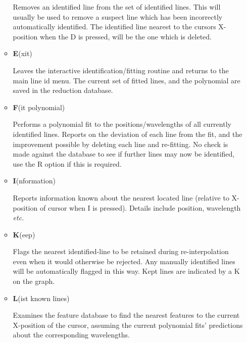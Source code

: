 \documentclass[twoside,11pt,nolof]{starlink}
\newcommand{\sunspec}[2]{#2}
\newcommand{\myindex}[1]{\index{#1}}
\begin{document}
\begin{itemize}
\begin{itemize}
            Removes an identified line from
            the set of identified lines. This will usually be used to
            remove a suspect line which has been incorrectly automatically
            identified. The identified line nearest to the cursors
            X-position when the D is pressed,  will be the one which is
            deleted.

      \item {\sunspec{\Large\tt}{\bf} E}(xit)

            Leaves the interactive
            identification/fitting routine and returns to the main line id
            menu. The current set of fitted lines,  and the polynomial are
            saved in the reduction database.

      \item {\sunspec{\Large\tt}{\bf} F}(it polynomial)

            Performs a polynomial fit to
            the positions/wavelengths of all currently identified lines.
            Reports on the deviation of each line from the fit,  and the
            improvement possible by deleting each line and re-fitting. No
            check is made against the database to see if further lines may
            now be identified, use the R option if this is required.

      \item {\sunspec{\Large\tt}{\bf} I}(nformation)

            Reports information known about
            the nearest located line (relative to X-position of cursor when
            I is pressed). Details include position, wavelength {\it etc.}

      \item {\sunspec{\Large\tt}{\bf} K}(eep)

            Flags the nearest identified-line to
            be retained during re-interpolation even when it
            would otherwise be rejected. Any manually identified lines will
            be automatically flagged in this way. Kept lines are indicated
            by a K on the graph.

      \item {\sunspec{\Large\tt}{\bf} L}(ist known lines)
            \myindex{Arc fitting!list known lines}

            Examines the feature database
            to find the nearest features to the current X-position of the
            cursor,  assuming the current polynomial fits' predictions
            about the corresponding wavelengths.


\end{itemize}
\end{itemize}
\end{document}

